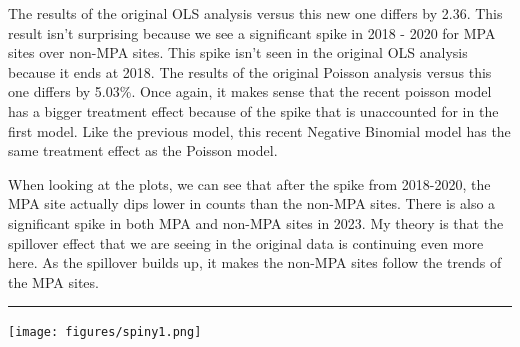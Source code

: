 \documentclass[
]{article}
\begin{document}
The results of the original OLS analysis versus this new one differs by
2.36. This result isn't surprising because we see a significant spike in
2018 - 2020 for MPA sites over non-MPA sites. This spike isn't seen in
the original OLS analysis because it ends at 2018. The results of the
original Poisson analysis versus this one differs by 5.03\%. Once again,
it makes sense that the recent poisson model has a bigger treatment
effect because of the spike that is unaccounted for in the first model.
Like the previous model, this recent Negative Binomial model has the
same treatment effect as the Poisson model.

When looking at the plots, we can see that after the spike from
2018-2020, the MPA site actually dips lower in counts than the non-MPA
sites. There is also a significant spike in both MPA and non-MPA sites
in 2023. My theory is that the spillover effect that we are seeing in
the original data is continuing even more here. As the spillover builds
up, it makes the non-MPA sites follow the trends of the MPA sites.

\begin{center}\rule{0.5\linewidth}{0.5pt}\end{center}

\texttt{[image: figures/spiny1.png]}
\end{document}
